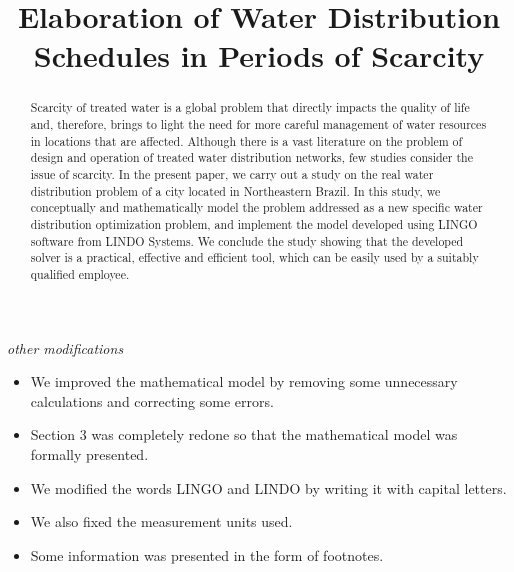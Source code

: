 \documentclass{singlecol}
\theoremstyle{TH}{
\newtheorem{lemma}{Lemma}
\newtheorem{theorem}[lemma]{Theorem}
\newtheorem{corrolary}[lemma]{Corrolary}
\newtheorem{conjecture}[lemma]{Conjecture}
\newtheorem{proposition}[lemma]{Proposition}
\newtheorem{claim}[lemma]{Claim}
\newtheorem{stheorem}[lemma]{Wrong Theorem}
\newtheorem{algorithm}{Algorithm}
}
\theoremstyle{THrm}{
\newtheorem{definition}{Definition}[section]
\newtheorem{question}{Question}[section]
\newtheorem{remark}{Remark}
\newtheorem{scheme}{Scheme}
}
\theoremstyle{THhit}{
\newtheorem{case}{Case}[section]
}
\begin{document}
\emph{other modifications}

\begin{itemize}
\item We improved the mathematical model by removing some unnecessary calculations and correcting some errors.
\item Section 3 was completely redone so that the mathematical model was formally presented.
\item We modified the words LINGO and LINDO by writing it with capital letters.
\item We also fixed the measurement units used.
\item Some information was presented in the form of footnotes.
\end{itemize}

\newpage

\setcounter{page}{1}






\BottomCatch

\CLline

\subtitle{}

\title{Elaboration of Water Distribution Schedules in Periods of Scarcity}

\begin{abstract}

Scarcity of treated water is a global problem that directly impacts the quality of life and, therefore, brings to light the need for more careful management of water resources in locations that are affected. Although there is a vast literature on the problem of design and operation of treated water distribution networks, few studies consider the issue of scarcity. In the present paper, we carry out a study on the real water distribution problem of a city located in Northeastern Brazil. In this study, we conceptually and mathematically model the problem addressed as a new specific water distribution optimization problem, and implement the model developed using LINGO software from LINDO Systems. We conclude the study showing that the developed solver is a practical, effective and efficient tool, which can be easily used by a suitably qualified employee.
\end{abstract}

\end{document}
